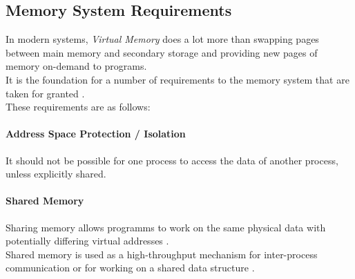 \subsection{Memory System Requirements}
In modern systems, \textit{Virtual Memory} does a lot more than swapping pages between main memory and secondary
storage and providing new pages of memory on-demand to programs.\\
It is the foundation for a number of requirements to the memory system that are taken for granted
\cite{jacobSoftwaremanagedAddressTranslation1997}.\\
These requirements are as follows:


\paragraph{Address Space Protection / Isolation} It should not be possible for one process to access the data
of another process, unless explicitly shared.
\cite{jacobVirtualMemoryContemporary1998}


\paragraph{Shared Memory} Sharing memory allows programms to work on the same physical data with potentially
differing virtual addresses \cite{jacobVirtualMemoryContemporary1998}.\\
Shared memory is used as a high-throughput mechanism for inter-process communication or for working on
a shared data structure \cite{tanenbaumOS}.


